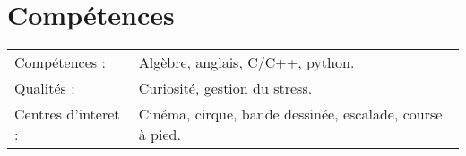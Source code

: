 \documentclass[a4paper,12pt]{article}
\begin{document}

\section{Compétences}
\begin{tabularx}{\linewidth}{@{}l X@{}}
Compétences : &  \normalsize{Algèbre, anglais, C/C++, python.}\\
Qualités : &  \normalsize{Curiosité, gestion du stress.}\\
Centres d'interet :  &  \normalsize{Cinéma, cirque, bande dessinée, escalade, course à pied.}\\  
\end{tabularx}

\vfill
{}
\end{document}
